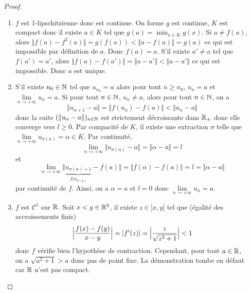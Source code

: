 \begin{proof}
	\phantom{}
	\begin{enumerate}
		\item $f$ est 1-lipschitzienne donc est continue. On forme 
		$g$ est continue, $K$ est compact donc il existe $a\in K$ tel que $g(a)=\min_{x\in K}g(x)$. Si $a\neq f(a)$, alors $\Vert f(a)-f^{2}(a)\Vert=g(f(a))<\Vert a-f(a)\Vert=g(a)$ ce qui est impossible par définition de $a$. Donc $f(a)=a$. S'il existe $a'\neq a$ tel que $f(a')=a'$, alors $\Vert f(a)-f(a')\Vert=\Vert a-a'\Vert<\Vert a-a'\Vert$ ce qui est impossible. Donc $a$ est unique.

		\item S'il existe $n_{0}\in\mathbb{N}$ tel que $u_{n_{0}}=a$ alors pour tout $n\geqslant n_{0}$, $u_{n}=a$ et $\lim\limits_{n\to+\infty}u_{n}=a$. Si pour tout $n\in\mathbb{N}$, $u_{n}\neq a$, alors pour tout $n\in\mathbb{N}$, on a
		\begin{equation}\Vert u_{n+1}-a\Vert=\Vert f(u_{n})-f(a)\Vert<\Vert u_{n}-a\Vert\end{equation}
		donc la suite $(\Vert u_{n}-a\Vert)_{n\in\mathbb{N}}$ est strictement décroissante dans $\mathbb{R}_{+}$ donc elle converge vers $l\geqslant0$. Par compacité de $K$, il existe une extraction $\sigma$ telle que $\lim\limits_{n\to+\infty}u_{\sigma(n)}=\alpha\in K$. Par continuité, \begin{equation}\lim\limits_{n\to+\infty}\Vert u_{\sigma(n)}-a\Vert=\Vert\alpha-a\Vert=l\end{equation} 
		et
		\begin{equation}\lim\limits_{n\to+\infty}\Vert \underbrace{u_{\sigma(n)+1}}_{f(u_{\sigma(n)}}-f(a)\Vert=\Vert f(\alpha)-f(a)\Vert=l=\Vert\alpha-a\Vert\end{equation}
		par continuité de $f$.
		Ainsi, on a $\alpha=a$ et $l=0$ donc $\lim\limits_{n\to+\infty}u_{n}=a$.

		\item $f$ est $\mathcal{C}^{1}$ sur $\mathbb{R}$. Soit $x<y\in\mathbb{R}^{2}$, il existe $z\in]x,y[$ tel que (égalité des accroissements finis)
		\begin{equation}\Bigl\lvert\frac{f(x)-f(y)}{x-y}\Bigr\rvert=\vert f'(z)\vert=\Bigl\lvert\frac{z}{\sqrt{z^{2}+1}}\Bigr\rvert<1\end{equation}
		donc $f$ vérifie bien l'hypothèse de contraction. Cependant, pour tout $a\in\mathbb{R}$, on a $\sqrt{a^{2}+1}>a$ donc pas de point fixe. La démonstration tombe en défaut car $\mathbb{R}$ n'est pas compact.
	\end{enumerate}
\end{proof}

